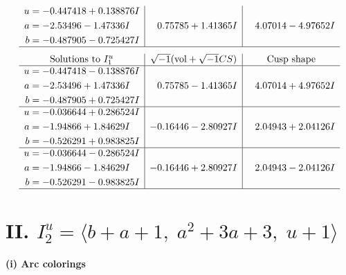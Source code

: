 \documentclass[1p]{elsarticle_modified}
\theoremstyle{definition}
\newcommand{\I}{\sqrt{-1}}
\begin{document}
$$\begin{array}{c|c|c}
\begin{aligned}
u &= -0.447418 + 0.138876 I \\
a &= -2.53496 - 1.47336 I \\
b &= -0.487905 - 0.725427 I\end{aligned}
 & \phantom{-}0.75785 + 1.41365 I & \phantom{-}4.07014 - 4.97652 I\\
 \hline 
 \end{array}$$\newpage$$\begin{array}{c|c|c}  
\text{Solutions to }I^u_{1}& \I (\text{vol} + \sqrt{-1}CS) & \text{Cusp shape}\\
 \hline 
\begin{aligned}
u &= -0.447418 - 0.138876 I \\
a &= -2.53496 + 1.47336 I \\
b &= -0.487905 + 0.725427 I\end{aligned}
 & \phantom{-}0.75785 - 1.41365 I & \phantom{-}4.07014 + 4.97652 I \\ \hline\begin{aligned}
u &= -0.036644 + 0.286524 I \\
a &= -1.94866 + 1.84629 I \\
b &= -0.526291 + 0.983825 I\end{aligned}
 & -0.16446 - 2.80927 I & \phantom{-}2.04943 + 2.04126 I \\ \hline\begin{aligned}
u &= -0.036644 - 0.286524 I \\
a &= -1.94866 - 1.84629 I \\
b &= -0.526291 - 0.983825 I\end{aligned}
 & -0.16446 + 2.80927 I & \phantom{-}2.04943 - 2.04126 I\\
 \hline 
 \end{array}$$\newpage\newpage\renewcommand{\arraystretch}{1}
\centering \section*{II. $I^u_{2}= \langle b+a+1,\;a^2+3 a+3,\;u+1 \rangle$}
\flushleft \textbf{(i) Arc colorings}\\
\end{document}

